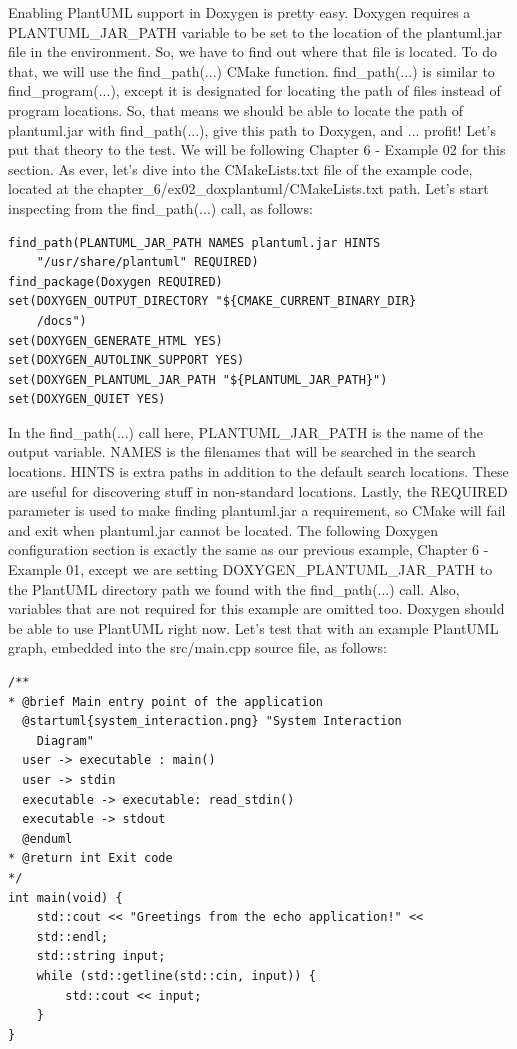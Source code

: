 Enabling PlantUML support in Doxygen is pretty easy. Doxygen requires a PLANTUML\_JAR\_PATH variable to be set to the location of the plantuml.jar file in the environment. So, we have to find out where that file is located. To do that, we will use the find\_path(...) CMake function. find\_path(...) is similar to find\_program(...), except it is designated for locating the path of files instead of program locations. So, that means we should be able to locate the path of plantuml.jar with find\_path(...), give this path to Doxygen, and ... profit! Let's put that theory to the test. We will be following Chapter 6 - Example 02 for this section. As ever, let's dive into the CMakeLists.txt file of the example code, located at the chapter\_6/ex02\_doxplantuml/CMakeLists.txt path. Let's start inspecting from the find\_path(...) call, as follows:

\begin{lstlisting}[style=styleCMake]
find_path(PLANTUML_JAR_PATH NAMES plantuml.jar HINTS
	"/usr/share/plantuml" REQUIRED)
find_package(Doxygen REQUIRED)
set(DOXYGEN_OUTPUT_DIRECTORY "${CMAKE_CURRENT_BINARY_DIR}
	/docs")
set(DOXYGEN_GENERATE_HTML YES)
set(DOXYGEN_AUTOLINK_SUPPORT YES)
set(DOXYGEN_PLANTUML_JAR_PATH "${PLANTUML_JAR_PATH}")
set(DOXYGEN_QUIET YES)
\end{lstlisting}

In the find\_path(...) call here, PLANTUML\_JAR\_PATH is the name of the output variable. NAMES is the filenames that will be searched in the search locations. HINTS is extra paths in addition to the default search locations. These are useful for discovering stuff in non-standard locations. Lastly, the REQUIRED parameter is used to make finding plantuml.jar a requirement, so CMake will fail and exit when plantuml.jar cannot be located. The following Doxygen configuration section is exactly the same as our previous example, Chapter 6 - Example 01, except we are setting DOXYGEN\_PLANTUML\_JAR\_PATH to the PlantUML directory path we found with the find\_path(...) call. Also, variables that are not required for this example are omitted too. Doxygen should be able to use PlantUML right now. Let's test that with an example PlantUML graph, embedded into the src/main.cpp source file, as follows:

\begin{lstlisting}[style=styleCXX]
/**
* @brief Main entry point of the application
  @startuml{system_interaction.png} "System Interaction
    Diagram"
  user -> executable : main()
  user -> stdin
  executable -> executable: read_stdin()
  executable -> stdout
  @enduml
* @return int Exit code
*/
int main(void) {
	std::cout << "Greetings from the echo application!" <<
	std::endl;
	std::string input;
	while (std::getline(std::cin, input)) {
		std::cout << input;
	}
}
\end{lstlisting}

